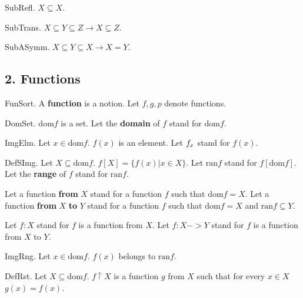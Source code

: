 \begin{lemma} SubRefl.
$X \subseteq X$.
\end{lemma}

\begin{lemma} SubTrans.
$X \subseteq Y \subseteq Z  \rightarrow  X \subseteq Z$.
\end{lemma}

\begin{axiom} SubASymm.
$X \subseteq Y \subseteq X  \rightarrow  X = Y$.
\end{axiom}


\subsection{2. Functions}


\begin{signature} FunSort.
A {\bf function} is a notion.
Let $f,g,p$ denote functions.
\end{signature}

\begin{signature} DomSet.
$\text{dom} f$ is a set.
Let the {\bf domain} of $f$ stand for $\text{dom} f$.
\end{signature}

\begin{signature} ImgElm.
Let $x \in \text{dom} f$. $f(x)$ is an element.
Let ${f}_{x}$ stand for $f(x)$.
\end{signature}

\begin{definition} DefSImg. 
Let $X \subseteq \text{dom} f$. $f[X] = \{ f(x) | x \in X \}$.
Let $\text{ran} f$ stand for $f[\text{dom} f]$.
Let the {\bf range} of $f$ stand for $\text{ran} f$.

Let a function {\bf from} $X$ stand for a function $f$
such that $\text{dom} f = X$.
Let a function {\bf from} $X$ {\bf to} $Y$ stand 
for a function $f$ such that $\text{dom} f = X$
and $\text{ran} f \subseteq Y$.

Let $f : X$ stand for $f$ is a function from $X$.
Let $f : X -> Y$ stand for $f$ is a function from $X$ to $Y$.
\end{definition}

\begin{lemma} ImgRng.
Let $x \in \text{dom} f$. $f(x)$ belongs to $\text{ran} f$.
\end{lemma}

\begin{definition} DefRst.
Let $X \subseteq \text{dom} f$. 
$f \upharpoonright X$ is a function $g$ from $X$
such that for every $x \in X$ $g(x) = f(x)$.
\end{definition}

